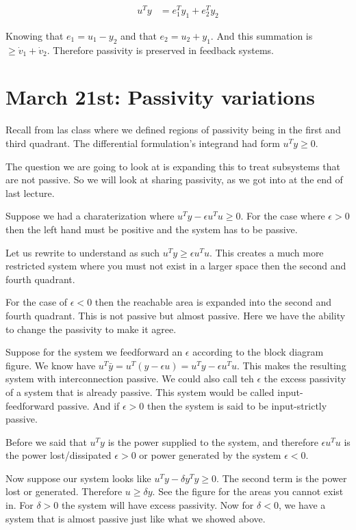 \documentclass[11pt]{article}
\begin{document}
\begin{align}
	u^Ty &= e_1^Ty_1 + e_2^Ty_2
\end{align}

Knowing that $e_1 = u_1 - y_2$ and that $e_2 = u_2 + y_1$. And this summation is $\geq \dot{v}_1 + \dot{v}_2$. Therefore passivity is preserved in feedback systems.







\section*{March 21st: Passivity variations}
Recall from las class where we defined regions of passivity being in the first and third quadrant. The differential formulation's integrand had form $u^Ty \geq 0$.

The question we are going to look at is expanding this to treat subsystems that are not passive. So we will look at sharing passivity, as we got into at the end of last lecture.

Suppose we had a charaterization where $u^Ty - \epsilon u^Tu \geq 0$. For the case where $\epsilon >0$ then the left hand must be positive and the system has to be passive.

Let us rewrite to understand as such $u^Ty \geq \epsilon u^Tu$. This creates a much more restricted system where you must not exist in a larger space then the second and fourth quadrant.

For the case of $\epsilon < 0$ then the reachable area is expanded into the second and fourth quadrant. This is not passive but almost passive. Here we have the ability to change the passivity to make it agree.

Suppose for the system we feedforward an $\epsilon$ according to the block diagram figure. We know have $u^T \bar{y} = u^T(y - \epsilon u) = u^Ty - \epsilon u^Tu$. This makes the resulting system with interconnection passive. We could also call teh $\epsilon$ the excess passivity of a system that is already passive. This system would be called input-feedforward passive. And if $\epsilon > 0$ then the system is said to be input-strictly passive.

Before we said that $u^Ty$ is the power supplied to the system, and therefore $\epsilon u^Tu$ is the power lost/dissipated $\epsilon >0$ or power generated by the system $\epsilon < 0$.

Now suppose our system looks like $u^Ty - \delta y^Ty \geq 0$. The second term is the power lost or generated. Therefore $u \geq \delta y$. See the figure for the areas you cannot exist in. For $\delta > 0$ the system will have excess passivity. Now for $\delta < 0$, we have a system that is almost passive just like what we showed above.
\end{document}
